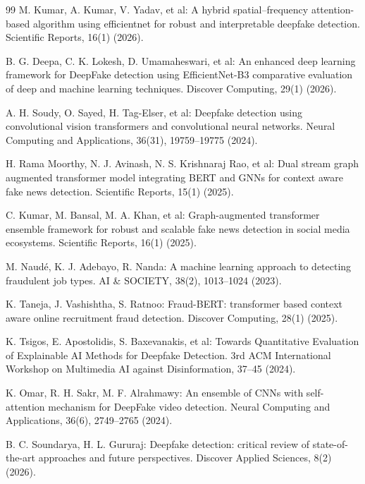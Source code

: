 \documentclass[runningheads]{llncs}
\begin{document}
\begin{thebibliography}{99}
M. Kumar, A. Kumar, V. Yadav, et al: A hybrid spatial–frequency attention-based algorithm using efficientnet for robust and interpretable deepfake detection. Scientific Reports, 16(1) (2026). 

B. G. Deepa, C. K. Lokesh, D. Umamaheswari, et al: An enhanced deep learning framework for DeepFake detection using EfficientNet-B3 comparative evaluation of deep and machine learning techniques. Discover Computing, 29(1) (2026). 

A. H. Soudy, O. Sayed, H. Tag-Elser, et al: Deepfake detection using convolutional vision transformers and convolutional neural networks. Neural Computing and Applications, 36(31), 19759–19775 (2024). 

H. Rama Moorthy, N. J. Avinash, N. S. Krishnaraj Rao, et al: Dual stream graph augmented transformer model integrating BERT and GNNs for context aware fake news detection. Scientific Reports, 15(1) (2025). 

C. Kumar, M. Bansal, M. A. Khan, et al: Graph-augmented transformer ensemble framework for robust and scalable fake news detection in social media ecosystems. Scientific Reports, 16(1) (2025). 

M. Naudé, K. J. Adebayo, R. Nanda: A machine learning approach to detecting fraudulent job types. AI & SOCIETY, 38(2), 1013–1024 (2023). 

K. Taneja, J. Vashishtha, S. Ratnoo: Fraud-BERT: transformer based context aware online recruitment fraud detection. Discover Computing, 28(1) (2025). 

K. Tsigos, E. Apostolidis, S. Baxevanakis, et al: Towards Quantitative Evaluation of Explainable AI Methods for Deepfake Detection. 3rd ACM International Workshop on Multimedia AI against Disinformation, 37–45 (2024). 

K. Omar, R. H. Sakr, M. F. Alrahmawy: An ensemble of CNNs with self-attention mechanism for DeepFake video detection. Neural Computing and Applications, 36(6), 2749–2765 (2024). 

B. C. Soundarya, H. L. Gururaj: Deepfake detection: critical review of state-of-the-art approaches and future perspectives. Discover Applied Sciences, 8(2) (2026). 


\end{thebibliography}
\end{document}
